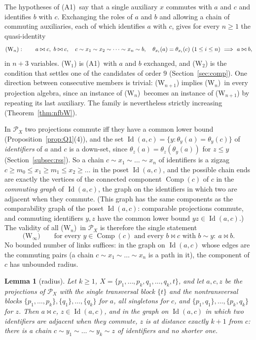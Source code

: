\documentclass[11pt]{amsart}
\newtheorem{lemma}[theorem]{Lemma}
\theoremstyle{definition}
\renewcommand{\P}{\mathcal{P}}      %
\newcommand{\Id}{\operatorname{Id}}
\newcommand{\Comp}{\operatorname{Comp}}
\newcommand{\mt}{\bowtie}      %
\newcommand{\Rcond}{\textup{(A1)}}     %
\newcommand{\Wn}[1][n]{\textup{(W$_{#1}$)}}
\begin{document}
The hypotheses of \Rcond\ say that a single auxiliary $x$ commutes with $a$ and $c$ and identifies $b$ with $c$. Exchanging the roles of $a$ and $b$ and allowing a chain of commuting auxiliaries, each of which identifies $a$ with $c$, gives for every $n\ge1$ the quasi-identity
\[
\Wn:\qquad a\mt c,\ b\mt c,\quad c\sim x_1\sim x_2\sim\dots\sim x_n\sim b,\quad \theta_{x_i}(a)=\theta_{x_i}(c)\ (1\le i\le n)\ \Longrightarrow\ a\mt b ,
\]
in $n+3$ variables. \Wn[1] is \Rcond\ with $a$ and $b$ exchanged, and \Wn[2] is the condition that settles one of the candidates of order $9$ (Section~\ref{sec:comp}). One direction between consecutive members is trivial: \Wn[n+1] implies \Wn\ in every projection algebra, since an instance of \Wn\ becomes an instance of \Wn[n+1] by repeating its last auxiliary. The family is nevertheless strictly increasing (Theorem~\ref{thm:nfbW}).

In $\P_X$ two projections commute iff they have a common lower bound (Proposition~\ref{prop:Q1}(4)), and the set $\Id(a,c)=\{y:\theta_y(a)=\theta_y(c)\}$ of \emph{identifiers} of $a$ and $c$ is a down-set, since $\theta_z(a)=\theta_z(\theta_y(a))$ for $z\le y$ (Section~\ref{subsec:rss}). So a chain $c\sim x_1\sim\dots\sim x_n$ of identifiers is a zigzag $c\ge m_0\le x_1\ge m_1\le x_2\ge\dots$ in the poset $\Id(a,c)$, and the possible chain ends are exactly the vertices of the connected component $\Comp(c)$ of $c$ in the \emph{commuting graph} of $\Id(a,c)$, the graph on the identifiers in which two are adjacent when they commute. (This graph has the same components as the comparability graph of the poset $\Id(a,c)$: comparable projections commute, and commuting identifiers $y,z$ have the common lower bound $yz\in\Id(a,c)$.) The validity of all \Wn\ in $\P_X$ is therefore the single statement
\[
\text{(W$_\infty$)}\qquad \text{for every } y\in\Comp(c) \text{ and every } b\mt c \text{ with } b\sim y:\ a\mt b .
\]
No bounded number of links suffices: in the graph on $\Id(a,c)$ whose edges are the commuting pairs (a chain $c\sim x_1\sim\dots\sim x_n$ is a path in it), the component of $c$ has unbounded radius.

\begin{lemma}[radius]\label{lem:radius}
Let $k\ge1$, $X=\{p_1,\dots,p_k,q_1,\dots,q_k,t\}$, and let $a,c,z$ be the projections of $\P_X$ with the single transversal block $\{t\}$ and the nontransversal blocks $\{p_1,\dots,p_k\},\{q_1\},\dots,\{q_k\}$ for $a$, all singletons for $c$, and $\{p_1,q_1\},\dots,\{p_k,q_k\}$ for $z$. Then $a\mt c$, $z\in\Id(a,c)$, and in the graph on $\Id(a,c)$ in which two identifiers are adjacent when they commute, $z$ is at distance exactly $k+1$ from $c$: there is a chain $c\sim y_1\sim\dots\sim y_k\sim z$ of identifiers and no shorter one.
\end{lemma}
\end{document}
